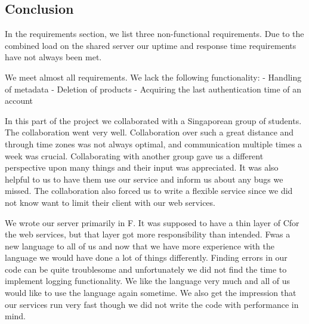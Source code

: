 \subsection{Conclusion}
In the requirements section, we list three non-functional requirements. Due to the combined load on the shared server our uptime and response time requirements have not always been met.

We meet almost all requirements. We lack the following functionality:
- Handling of metadata
- Deletion of products
- Acquiring the last authentication time of an account

In this part of the project we collaborated with a Singaporean group of students. The collaboration went very well. Collaboration over such a great distance and through time zones was not always optimal, and communication multiple times a week was crucial.
Collaborating with another group gave us a different perspective upon many things and their input was appreciated. It was also helpful to us to have them use our service and inform us about any bugs we missed.
The collaboration also forced us to write a flexible service since we did not know want to limit their client with our web services.

We wrote our server primarily in F\Sh. It was supposed to have a thin layer of C\Sh for the web services, but that layer got more responsibility than intended. 
F\Sh was a new language to all of us and now that we have more experience with the language we would have done a lot of things differently. Finding errors in our code can be quite troublesome and unfortunately we did not find the time to implement logging functionality. We like the language very much and all of us would like to use the language again sometime. We also get the impression that our services run very fast though we did not write the code with performance in mind.
\newpage